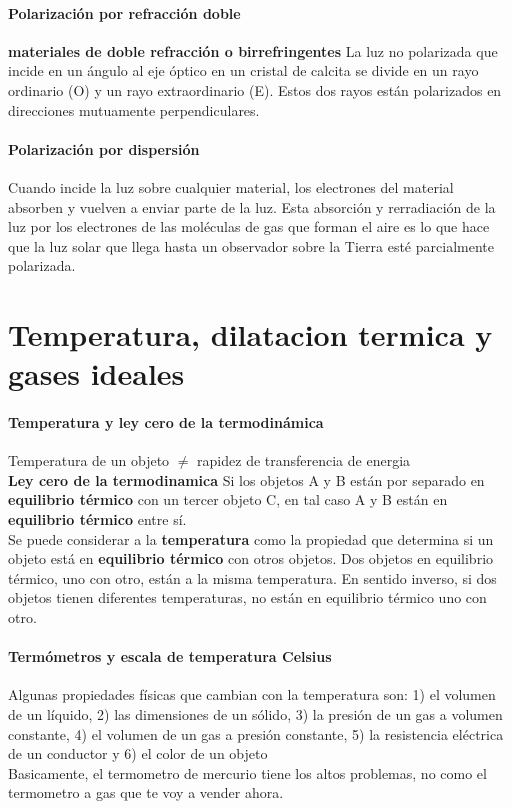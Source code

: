 \documentclass[10pt]{article}
\begin{document}
\paragraph{Polarización por refracción doble}
\textbf{ materiales de doble refracción o birrefringentes} La luz no polarizada que incide en un ángulo al eje óptico en un
cristal de calcita se divide en un rayo ordinario (O) y un rayo extraordinario (E). Estos dos rayos están polarizados
en direcciones mutuamente perpendiculares.
\paragraph{Polarización por dispersión}
Cuando incide la luz sobre cualquier material, los electrones del material absorben y
vuelven a enviar parte de la luz. Esta absorción y rerradiación de la luz por los electrones
de las moléculas de gas que forman el aire es lo que hace que la luz solar que llega hasta
un observador sobre la Tierra esté parcialmente polarizada. 


\section{Temperatura, dilatacion termica y gases ideales}

\paragraph{Temperatura y ley cero de la termodinámica}

Temperatura de un objeto $\neq$ rapidez de transferencia de energia\\

\textbf{Ley cero de la termodinamica} Si los objetos A y B están por separado en \textbf{equilibrio térmico} con un tercer objeto C, en tal caso A y B están en \textbf{equilibrio térmico} entre sí.\\
Se puede considerar a la \textbf{temperatura} como la propiedad que determina si un objeto está en \textbf{equilibrio térmico} con otros objetos. Dos objetos en equilibrio térmico, uno con otro, están a la misma temperatura. En sentido inverso, si dos objetos tienen diferentes temperaturas, no están en equilibrio térmico uno con otro.

\paragraph{Termómetros y escala de temperatura Celsius}
Algunas propiedades físicas
que cambian con la temperatura son: 1) el volumen de un líquido, 2) las dimensiones de un sólido, 3) la presión de un gas a volumen constante, 4) el volumen de un gas a presión constante, 5) la resistencia eléctrica de un conductor y 6) el color de un objeto\\
\linebreak
Basicamente, el termometro de mercurio tiene los altos problemas, no como el termometro a gas que te voy a vender ahora.
\end{document}
